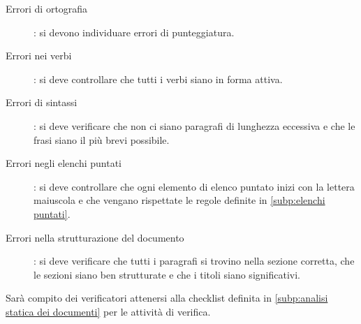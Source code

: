 \documentclass[../norme-di-progetto.tex]{subfiles}
\begin{document}
\begin{description}
		\item [Errori di ortografia]: si devono individuare errori di punteggiatura.
		\item [Errori nei verbi]: si deve controllare che tutti i verbi siano in forma attiva.
		\item [Errori di sintassi]: si deve verificare che non ci siano paragrafi di lunghezza eccessiva e che le frasi siano il più brevi possibile.
		\item [Errori negli elenchi puntati]: si deve controllare che ogni elemento di elenco puntato inizi con la lettera maiuscola e che vengano rispettate le regole definite in \ref{subp:elenchi puntati}.
		\item [Errori nella strutturazione del documento]: si deve verificare che tutti i paragrafi si trovino nella sezione corretta, che le sezioni siano ben strutturate e che i titoli siano significativi.
\end{description}
Sarà compito dei verificatori attenersi alla checklist definita in \ref{subp:analisi statica dei documenti} per le attività di verifica.
\end{document}
